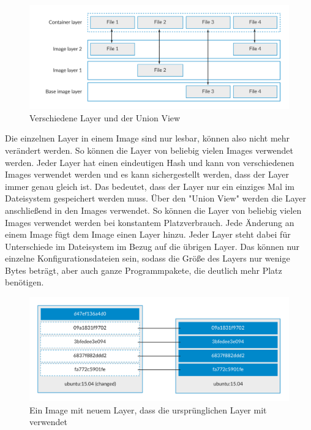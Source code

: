 \begin{figure}[!ht]
  \centering
  \includegraphics[width=1\textwidth]{images/union.png}
  \caption{Verschiedene Layer und der Union View \cite{docker:aufs}}
\end{figure}

\noindent Die einzelnen Layer in einem Image sind nur lesbar, können also nicht mehr verändert werden. So können die Layer von beliebig vielen Images verwendet werden. Jeder Layer hat einen eindeutigen Hash und kann von verschiedenen Images verwendet werden und es kann sichergestellt werden, dass der Layer immer genau gleich ist. Das bedeutet, dass der Layer nur ein einziges Mal im Dateisystem gespeichert werden muss. Über den "{}Union View"{} werden die Layer anschließend in den Images verwendet. So können die Layer von beliebig vielen Images verwendet werden bei konstantem Platzverbrauch. Jede Änderung an einem Image fügt dem Image einen Layer hinzu. Jeder Layer steht dabei für Unterschiede im Dateisystem im Bezug auf die übrigen Layer. Das können nur einzelne Konfigurationsdateien sein, sodass die Größe des Layers nur wenige Bytes beträgt, aber auch ganze Programmpakete, die deutlich mehr Platz benötigen.\\

\begin{figure}[!ht]
  \centering
  \includegraphics[width=1\textwidth]{images/10-docker-image-layer-sharing.png}
  \caption{Ein Image mit neuem Layer, dass die ursprünglichen Layer mit verwendet \cite{docker:images}}
\end{figure}

